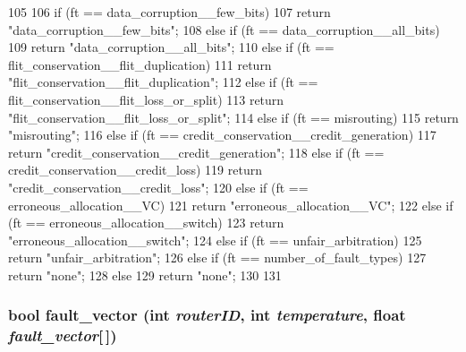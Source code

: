 \begin{DoxyCode}
105 {
106    if (ft == data_corruption__few_bits){
107        return "data_corruption__few_bits";
108    } else if (ft == data_corruption__all_bits){
109       return "data_corruption__all_bits";
110    } else if (ft == flit_conservation__flit_duplication){
111       return "flit_conservation__flit_duplication";
112    } else if (ft == flit_conservation__flit_loss_or_split){
113       return "flit_conservation__flit_loss_or_split";
114    } else if (ft == misrouting){
115       return "misrouting";
116    } else if (ft == credit_conservation__credit_generation){
117       return "credit_conservation__credit_generation";
118    } else if (ft == credit_conservation__credit_loss){
119       return "credit_conservation__credit_loss";
120    } else if (ft == erroneous_allocation__VC){
121       return "erroneous_allocation__VC";
122    } else if (ft == erroneous_allocation__switch){
123       return "erroneous_allocation__switch";
124    } else if (ft == unfair_arbitration){
125       return "unfair_arbitration";
126    } else if (ft == number_of_fault_types){
127       return "none";
128    } else {
129       return "none";
130    }
131 }
\end{DoxyCode}
\hypertarget{classFaultModel_a25ca83d60796d678cc73f46c3553368b}{
\subsubsection[{fault\_\-vector}]{\setlength{\rightskip}{0pt plus 5cm}bool fault\_\-vector (int {\em routerID}, \/  int {\em temperature}, \/  float {\em fault\_\-vector}\mbox{[}$\,$\mbox{]})}}
\label{classFaultModel_a25ca83d60796d678cc73f46c3553368b}



